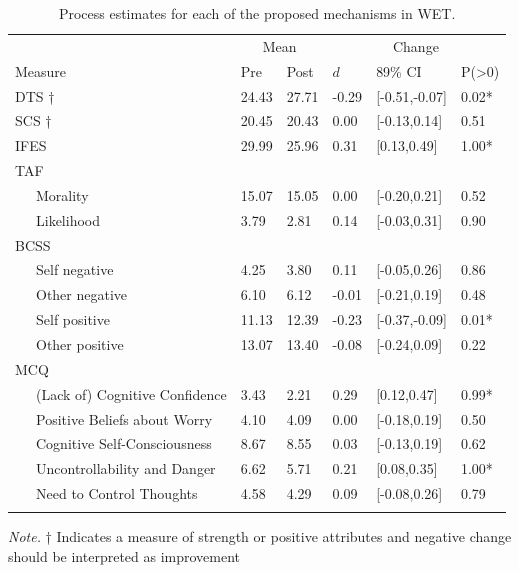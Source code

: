 \documentclass[
  man,floatsintext]{apa7}
\begin{document}
\begin{table}[tbp]

\begin{center}
\begin{threeparttable}

\caption{\label{tab:processes_tab}Process estimates for each of the proposed mechanisms in WET.}

\begin{tabular}{llllll}
\toprule
 & \multicolumn{2}{c}{Mean} & \multicolumn{3}{c}{Change} \\
\cmidrule(r){2-3} \cmidrule(r){4-6}
Measure & Pre & Post & $d$ & 89\% CI & P(>0)\\
\midrule
DTS † & 24.43 & 27.71 & -0.29 & {}[-0.51,-0.07] & 0.02*\\
SCS † & 20.45 & 20.43 & 0.00 & {}[-0.13,0.14] & 0.51\\
IFES & 29.99 & 25.96 & 0.31 & {}[0.13,0.49] & 1.00*\\
TAF &  &  &  &  & \\
\ \ \ Morality & 15.07 & 15.05 & 0.00 & {}[-0.20,0.21] & 0.52\\
\ \ \ Likelihood & 3.79 & 2.81 & 0.14 & {}[-0.03,0.31] & 0.90\\
BCSS &  &  &  &  & \\
\ \ \ Self negative & 4.25 & 3.80 & 0.11 & {}[-0.05,0.26] & 0.86\\
\ \ \ Other negative & 6.10 & 6.12 & -0.01 & {}[-0.21,0.19] & 0.48\\
\ \ \ Self positive & 11.13 & 12.39 & -0.23 & {}[-0.37,-0.09] & 0.01*\\
\ \ \ Other positive & 13.07 & 13.40 & -0.08 & {}[-0.24,0.09] & 0.22\\
MCQ &  &  &  &  & \\
\ \ \ (Lack of) Cognitive Confidence & 3.43 & 2.21 & 0.29 & {}[0.12,0.47] & 0.99*\\
\ \ \ Positive Beliefs about Worry & 4.10 & 4.09 & 0.00 & {}[-0.18,0.19] & 0.50\\
\ \ \ Cognitive Self-Consciousness & 8.67 & 8.55 & 0.03 & {}[-0.13,0.19] & 0.62\\
\ \ \ Uncontrollability and Danger & 6.62 & 5.71 & 0.21 & {}[0.08,0.35] & 1.00*\\
\ \ \ Need to Control Thoughts & 4.58 & 4.29 & 0.09 & {}[-0.08,0.26] & 0.79\\
\bottomrule
\addlinespace
\end{tabular}

\begin{tablenotes}[para]
\normalsize{\textit{Note.}  † Indicates a measure of strength or positive attributes and negative change should be interpreted as improvement}
\end{tablenotes}

\end{threeparttable}
\end{center}

\end{table}
\end{document}
